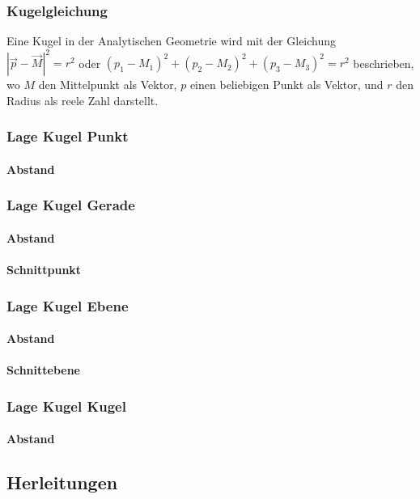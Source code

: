 \documentclass[a4paper]{article} %
\begin{document}
	\subsubsection{Kugelgleichung}
	Eine Kugel in der Analytischen Geometrie wird mit der Gleichung\\ $|\vec{p}-\vec{M}|^2=r^2$ oder
	$(p_1-M_1)^2+(p_2-M_2)^2+(p_3-M_3)^2=r^2$ beschrieben, wo $M$ den Mittelpunkt als Vektor, $p$ einen beliebigen Punkt als Vektor, und $r$ den Radius als reele Zahl darstellt.
	\subsubsection{Lage Kugel Punkt}
	\paragraph{Abstand}
	\subsubsection{Lage Kugel Gerade}
	\paragraph{Abstand}
	\paragraph{Schnittpunkt}
	\subsubsection{Lage Kugel Ebene}
	\paragraph{Abstand}
	\paragraph{Schnittebene}
	\subsubsection{Lage Kugel Kugel}
	\paragraph{Abstand}
	\subsection{Herleitungen}
\end{document}
